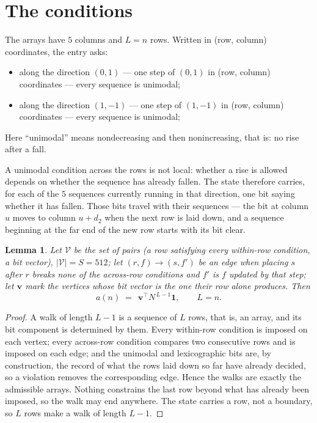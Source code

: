 \documentclass[11pt,a4paper]{article}
\theoremstyle{plain}
\newtheorem{lemma}[theorem]{Lemma}
\theoremstyle{definition}
\begin{document}
\section{The conditions}

The arrays have $5$ columns and $L=n$ rows. Written in (row, column)
coordinates, the entry asks:
\begin{itemize}
\item along the direction $(0,1)$ --- one step of $(0,1)$ in (row, column) coordinates --- every sequence is unimodal;
\item along the direction $(1,-1)$ --- one step of $(1,-1)$ in (row, column) coordinates --- every sequence is unimodal;
\end{itemize}
Here ``unimodal'' means nondecreasing and then nonincreasing, that is: no rise after a fall.

A unimodal condition across the rows is not local: whether a
rise is allowed depends on whether the sequence has already fallen. The state therefore
carries, for each of the $5$ sequences currently running in that direction, one bit saying
whether it has fallen. Those bits travel with their sequences --- the bit at column $u$
moves to column $u+d_2$ when the next row is laid down, and a sequence beginning at the
far end of the new row starts with its bit clear.

\begin{lemma}\label{lem:walk}
Let $\mathcal V$ be the set of pairs (a row satisfying every within-row condition, a
bit vector), $|\mathcal V|=S=512$; let $(r,f)\to(s,f')$ be an edge when placing $s$ after $r$
breaks none of the across-row conditions and $f'$ is $f$ updated by that step; let
$\mathbf{v}$ mark the vertices whose bit vector is the one their row alone produces.
Then
\[
a(n)\;=\;\,\mathbf{v}^{\!\top}N^{\,L-1}\mathbf{1},\qquad L=n.
\]
\end{lemma}

\begin{proof}
A walk of length $L-1$ is a sequence of $L$ rows, that is, an array, and its bit component
is determined by them. Every within-row condition is imposed on each vertex; every
across-row condition compares two consecutive rows and is imposed on each edge; and the
unimodal and lexicographic bits are, by construction, the record of what the rows laid down
so far have already decided, so a violation removes the corresponding edge. Hence the walks
are exactly the admissible arrays. Nothing constrains the last row beyond what has already
been imposed, so the walk may end anywhere. The state carries a row, not a boundary, so
$L$ rows make a walk of length $L-1$.
\end{proof}
\end{document}

